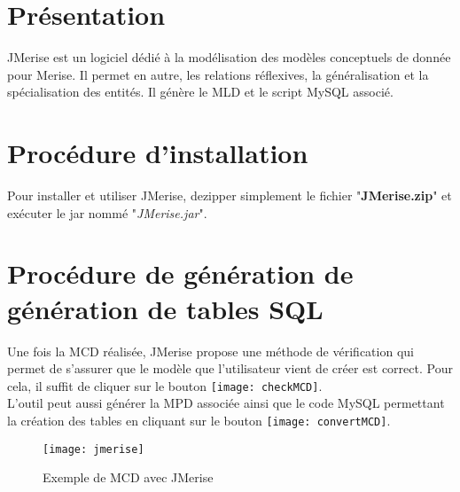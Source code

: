 \documentclass[11pt,fleqn]{report}
\begin{document}
\ZMakeCover


\ZMakeTableOfContents

\section{Présentation}
JMerise est un logiciel dédié à la modélisation des modèles conceptuels de donnée pour Merise. Il permet en autre, les relations réflexives, la généralisation et la spécialisation des entités. Il génère le MLD et le script MySQL associé.

\section{Procédure d'installation}
Pour installer et utiliser JMerise, dezipper simplement le fichier "\textbf{JMerise.zip}" et exécuter le jar nommé "\textit{JMerise.jar}". 

\section{Procédure de génération de génération de tables SQL}
Une fois la MCD réalisée, JMerise propose une méthode de vérification qui permet de s'assurer que le modèle que l'utilisateur vient de créer est correct. Pour cela, il suffit de cliquer sur le bouton \texttt{[image: checkMCD]}.\\
L'outil peut aussi générer la MPD associée ainsi que le code MySQL permettant la création des tables en cliquant sur le bouton \texttt{[image: convertMCD]}.

\begin{figure}
\begin{center}
\texttt{[image: jmerise]}
\end{center}
\caption{Exemple de MCD avec JMerise}
\end{figure}



\newpage
\listoffigures

\end{document}
